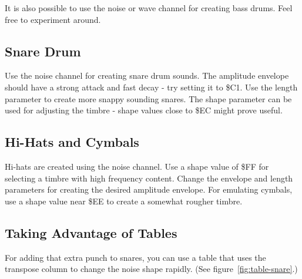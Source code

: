 It is also possible to use the noise or wave channel for creating bass drums. Feel free to experiment around.

\subsection{Snare Drum}

Use the noise channel for creating snare drum sounds. The amplitude envelope should have a strong attack and fast decay - try setting it to \$C1. Use the length parameter to create more snappy sounding snares. The shape parameter can be used for adjusting the timbre - shape values close to \$EC might prove useful.

\subsection{Hi-Hats and Cymbals}

Hi-hats are created using the noise channel. Use a shape value of \$FF for selecting a timbre with high frequency content. Change the envelope and length parameters for creating the desired amplitude envelope. For emulating cymbals, use a shape value near \$EE to create a somewhat rougher timbre.

\subsection{Taking Advantage of Tables}

For adding that extra punch to snares, you can use a table that uses the transpose column to change the noise shape rapidly. (See figure~\ref{fig:table-snare}.)



